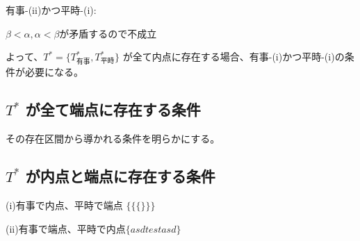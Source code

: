 \documentclass[main.tex]{subfiles}
\begin{document}
\noindent
有事-(ii)かつ平時-(i):

$\beta < \alpha, \alpha < \beta$が矛盾するので不成立


\bigskip
よって、$T^* = \lbrace T^*_{有事}, T^*_{平時} \rbrace$ が全て内点に存在する場合、有事-(i)かつ平時-(i)の条件が必要になる。





\subsection{$T^*$ が全て端点に存在する条件}

その存在区間から導かれる条件を明らかにする。



\subsection{$T^*$ が内点と端点に存在する条件}

(i)有事で内点、平時で端点 $\Big\{  \big\{ \{\} \big\} \Big\} $

(ii)有事で端点、平時で内点$\lbrace asd   test asd \rbrace$


\theendnotes %
\end{document}
